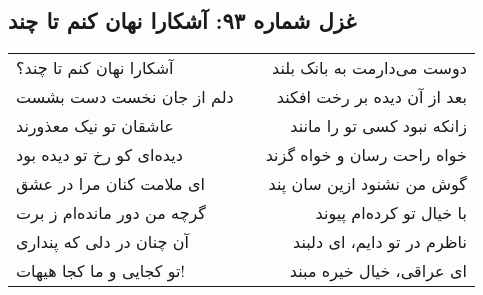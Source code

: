 \begin{center}
\section*{غزل شماره ۹۳: آشکارا نهان کنم تا چند}
\label{sec:093}
\begin{longtable}{l p{0.5cm} r}
آشکارا نهان کنم تا چند؟
&&
دوست می‌دارمت به بانک بلند
\\
دلم از جان نخست دست بشست
&&
بعد از آن دیده بر رخت افکند
\\
عاشقان تو نیک معذورند
&&
زانکه نبود کسی تو را مانند
\\
دیده‌ای کو رخ تو دیده بود
&&
خواه راحت رسان و خواه گزند
\\
ای ملامت کنان مرا در عشق
&&
گوش من نشنود ازین سان پند
\\
گرچه من دور مانده‌ام ز برت
&&
با خیال تو کرده‌ام پیوند
\\
آن چنان در دلی که پنداری
&&
ناظرم در تو دایم، ای دلبند
\\
تو کجایی و ما کجا هیهات!
&&
ای عراقی، خیال خیره مبند
\\
\end{longtable}
\end{center}
